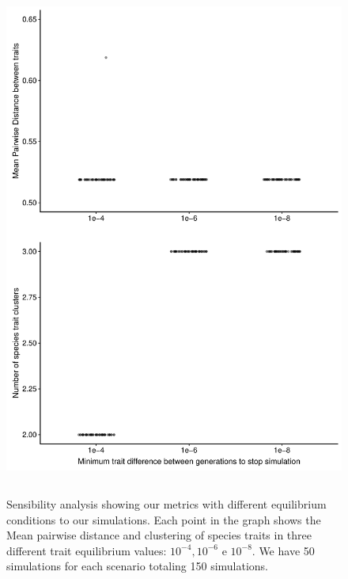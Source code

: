 \documentclass[a4paper, 12pt]{article}
\begin{document}
\begin{singlespace}
\begin{figure}[H]
 \centering
  \includegraphics[width = \linewidth, height = 17cm]{Sup_Figura_5.pdf}
  \vspace*{-7mm}
  \caption{Sensibility analysis showing our metrics with different equilibrium conditions to our simulations. Each point in the graph shows the Mean pairwise distance and clustering of species traits in three different trait equilibrium values: $10^{-4}, 10^{-6}$ e $10^{-8}$. We have 50 simulations for each scenario totaling 150 simulations.}
  \label{supfig:5}
\end{figure}


\end{singlespace}
\end{document}
